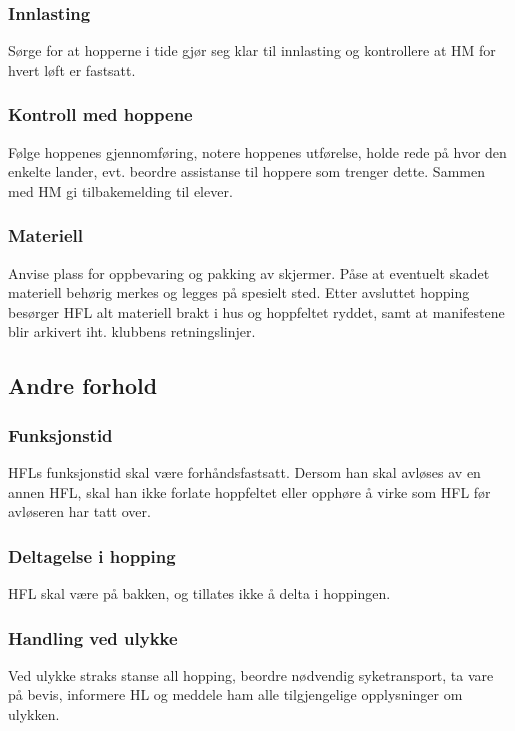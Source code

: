 \subsubsection{Innlasting}
Sørge for at hopperne i tide gjør seg klar til innlasting og kontrollere at HM for hvert løft er fastsatt.

\subsubsection{Kontroll med hoppene}
Følge hoppenes gjennomføring, notere hoppenes utførelse, holde rede på hvor den enkelte lander, evt. beordre assistanse til hoppere som trenger dette. Sammen med HM gi tilbakemelding til elever.

\subsubsection{Materiell}
Anvise plass for oppbevaring og pakking av skjermer. Påse at eventuelt skadet materiell behørig merkes og legges på spesielt sted. Etter avsluttet hopping besørger HFL alt materiell brakt i hus og hoppfeltet ryddet, samt at manifestene blir arkivert iht. klubbens retningslinjer.

\subsection{Andre forhold}
\subsubsection{Funksjonstid}
HFLs funksjonstid skal være forhåndsfastsatt. Dersom han skal avløses av en annen HFL, skal han ikke forlate hoppfeltet eller opphøre å virke som HFL før avløseren har tatt over.

\subsubsection{Deltagelse i hopping}
HFL skal være på bakken, og tillates ikke å delta i hoppingen.

\subsubsection{Handling ved ulykke}
Ved ulykke straks stanse all hopping, beordre nødvendig syketransport, ta vare på bevis, informere HL og meddele ham alle tilgjengelige opplysninger om ulykken.
